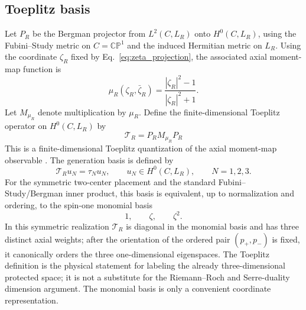 \documentclass[aps,prd,preprint,notitlepage,nofootinbib,superscriptaddress,floatfix]{revtex4-2}
\newcommand{\CP}{\mathbb{CP}}
\theoremstyle{remark}
\begin{document}
\subsection{Toeplitz basis}
\label{sec:toeplitz_basis}

Let \(P_R\) be the Bergman projector from \(L^2(C,L_R)\) onto \(H^0(C,L_R)\), using the Fubini--Study metric on \(C=\CP^1\) and the induced Hermitian metric on \(L_R\).
Using the coordinate \(\zeta_R\) fixed by Eq.~\eqref{eq:zeta_projection}, the associated axial moment-map function is
\begin{equation}
\mu_R(\zeta_R,\bar\zeta_R)
=
\frac{|\zeta_R|^2-1}{|\zeta_R|^2+1}.
\label{eq:moment_map}
\end{equation}
Let \(M_{\mu_R}\) denote multiplication by \(\mu_R\).
Define the finite-dimensional Toeplitz operator on \(H^0(C,L_R)\) by
\begin{equation}
\boxed{
\mathcal T_R=P_RM_{\mu_R}P_R
}
\label{eq:Toeplitz}
\end{equation}
This is a finite-dimensional Toeplitz quantization of the axial moment-map observable \cite{BordemannMeinrenkenSchlichenmaier1994}.
The generation basis is defined by
\begin{equation}
\mathcal T_Ru_N=\tau_Nu_N,
\qquad
u_N\in H^0(C,L_R),
\qquad
N=1,2,3.
\label{eq:uN_basis}
\end{equation}
For the symmetric two-center placement and the standard Fubini--Study/Bergman inner product, this basis is equivalent, up to normalization and ordering, to the spin-one monomial basis
\begin{equation}
1,\qquad \zeta,\qquad \zeta^2.
\end{equation}
In this symmetric realization \(\mathcal T_R\) is diagonal in the monomial basis and has three distinct axial weights; after the orientation of the ordered pair \((p_+,p_-)\) is fixed, it canonically orders the three one-dimensional eigenspaces.
The Toeplitz definition is the physical statement for labeling the already three-dimensional protected space; it is not a substitute for the Riemann--Roch and Serre-duality dimension argument.
The monomial basis is only a convenient coordinate representation.
\end{document}
